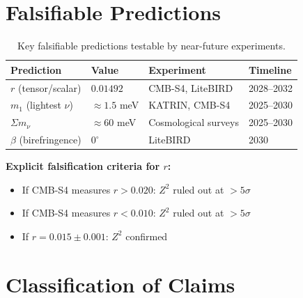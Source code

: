 \documentclass[11pt,a4paper]{article}
\theoremstyle{plain}
\theoremstyle{definition}
\theoremstyle{remark}
\begin{document}
\section{Falsifiable Predictions}
\label{sec:predictions}

\begin{table}[h!]
\centering
\begin{tabular}{llll}
\toprule
\textbf{Prediction} & \textbf{Value} & \textbf{Experiment} & \textbf{Timeline} \\
\midrule
$r$ (tensor/scalar) & $0.01492$ & CMB-S4, LiteBIRD & 2028--2032 \\
$m_1$ (lightest $\nu$) & $\approx 1.5$ meV & KATRIN, CMB-S4 & 2025--2030 \\
$\Sigma m_\nu$ & $\approx 60$ meV & Cosmological surveys & 2025--2030 \\
$\beta$ (birefringence) & $0^\circ$ & LiteBIRD & 2030 \\
\bottomrule
\end{tabular}
\caption{Key falsifiable predictions testable by near-future experiments.}
\end{table}

\textbf{Explicit falsification criteria for $r$:}
\begin{itemize}
  \item If CMB-S4 measures $r > 0.020$: $Z^2$ ruled out at $>5\sigma$
  \item If CMB-S4 measures $r < 0.010$: $Z^2$ ruled out at $>5\sigma$
  \item If $r = 0.015 \pm 0.001$: $Z^2$ confirmed
\end{itemize}

\section{Classification of Claims}
\end{document}
